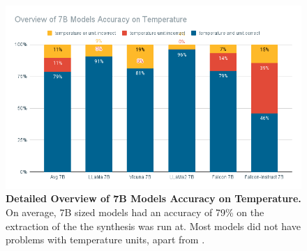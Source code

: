 \begin{figure}[!htb]
    \begin{centering}
        \includegraphics[width=\textwidth]{img/overview_7b_temp}
        \caption[7B Models Detailed Temperature Accuracy]{\textbf{Detailed Overview of 7B Models Accuracy on Temperature.}
        On average, 7B sized models had an accuracy of 79\% on the extraction of the \ttemp the synthesis was run at.
    Most models did not have problems with temperature units, apart from .}
        \label{fig:7b_temp}
    \end{centering}
\end{figure}
